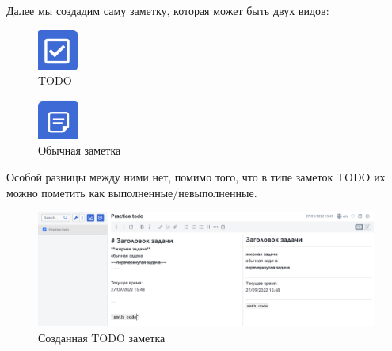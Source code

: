\documentclass[12pt, a4paper]{article}
\begin{document}
    Далее мы создадим саму заметку, которая может быть двух видов:
    \begin{multicols}{2}

        \begin{figure}[H]
            \centering
            \includegraphics[width=0.35\linewidth]{src/4.png}
            \caption{TODO}
        \end{figure}

    \columnbreak

        \begin{figure}[H]
            \centering
            \includegraphics[width=0.35\linewidth]{src/5.png}
            \caption{Обычная заметка}
        \end{figure}
        
    \end{multicols}

    Особой разницы между ними нет, помимо того, что в типе заметок
    TODO их можно пометить как выполненные/невыполненные.

    \begin{figure}[H]
        \centering
        \includegraphics[width=0.9\linewidth]{src/6.png}
        \caption{Созданная TODO заметка}
    \end{figure}
\end{document}
